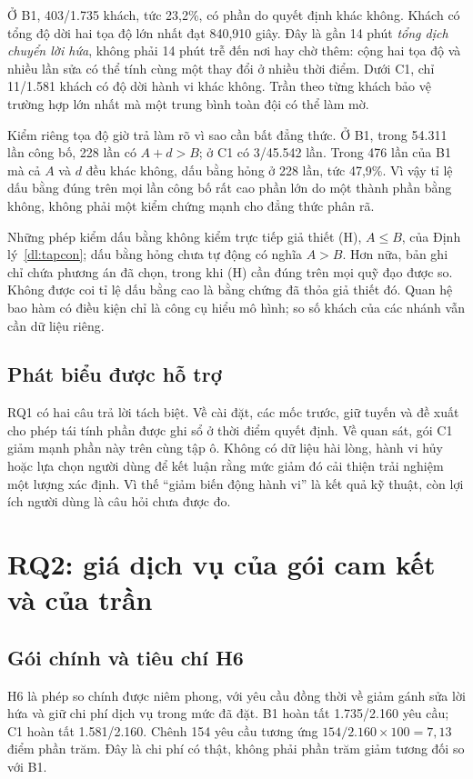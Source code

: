 Ở B1, 403/1.735 khách, tức 23,2\%, có phần do quyết định khác không. Khách có tổng độ
dời hai tọa độ lớn nhất đạt 840,910 giây. Đây là gần 14 phút \emph{tổng dịch chuyển lời
hứa}, không phải 14 phút trễ đến nơi hay chờ thêm: cộng hai tọa độ và nhiều lần sửa có
thể tính cùng một thay đổi ở nhiều thời điểm. Dưới C1, chỉ 11/1.581 khách có độ dời hành
vi khác không. Trần theo từng khách bảo vệ trường hợp lớn nhất mà một trung bình toàn
đội có thể làm mờ.

Kiểm riêng tọa độ giờ trả làm rõ vì sao cần bất đẳng thức. Ở B1, trong 54.311 lần công
bố, 228 lần có $A+d>B$; ở C1 có 3/45.542 lần. Trong 476 lần của B1 mà cả $A$ và $d$
đều khác không, dấu bằng hỏng ở 228 lần, tức 47,9\%. Vì vậy tỉ lệ dấu bằng đúng trên
mọi lần công bố rất cao phần lớn do một thành phần bằng không, không phải một kiểm
chứng mạnh cho đẳng thức phân rã.

Những phép kiểm dấu bằng không kiểm trực tiếp giả thiết (H), $A\le B$, của Định
lý~\ref{dl:tapcon}; dấu bằng hỏng chưa tự động có nghĩa $A>B$. Hơn nữa, bản ghi chỉ
chứa phương án đã chọn, trong khi (H) cần đúng trên mọi quỹ đạo được so. Không được
coi tỉ lệ dấu bằng cao là bằng chứng đã thỏa giả thiết đó. Quan hệ bao hàm có điều
kiện chỉ là công cụ hiểu mô hình; so số khách của các nhánh vẫn cần dữ liệu riêng.

\subsection{Phát biểu được hỗ trợ}

RQ1 có hai câu trả lời tách biệt. Về cài đặt, các mốc trước, giữ tuyến và đề xuất cho phép
tái tính phần được ghi sổ ở thời điểm quyết định. Về quan sát, gói C1 giảm mạnh phần này
trên cùng tập ô. Không có dữ liệu hài lòng, hành vi hủy hoặc lựa chọn người dùng để kết
luận rằng mức giảm đó cải thiện trải nghiệm một lượng xác định. Vì thế ``giảm biến động
hành vi'' là kết quả kỹ thuật, còn lợi ích người dùng là câu hỏi chưa được đo.

\section{RQ2: giá dịch vụ của gói cam kết và của trần}


\subsection{Gói chính và tiêu chí H6}

H6 là phép so chính được niêm phong, với yêu cầu đồng thời về giảm gánh sửa lời hứa và
giữ chi phí dịch vụ trong mức đã đặt. B1 hoàn tất 1.735/2.160 yêu cầu; C1 hoàn tất
1.581/2.160. Chênh 154 yêu cầu tương ứng $154/2.160\times100=7{,}13$ điểm phần trăm.
Đây là chi phí có thật, không phải phần trăm giảm tương đối so với B1.

